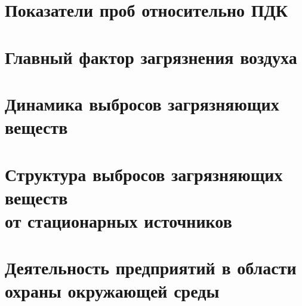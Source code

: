 



\section{Показатели проб относительно ПДК}
\begin{frame}{\insertsectionhead}
\end{frame}

\section{Главный фактор загрязнения воздуха}
\begin{frame}{\insertsectionhead}
\end{frame}

\section{Динамика выбросов загрязняющих веществ}
\begin{frame}{\insertsectionhead}
\end{frame}

\section{Структура выбросов загрязняющих веществ \\ от
стационарных источников}
\begin{frame}{\insertsectionhead}
\end{frame}



\section{Деятельность предприятий в области \\ охраны окружающей среды}
\begin{frame}{\insertsectionhead}
\end{frame}







